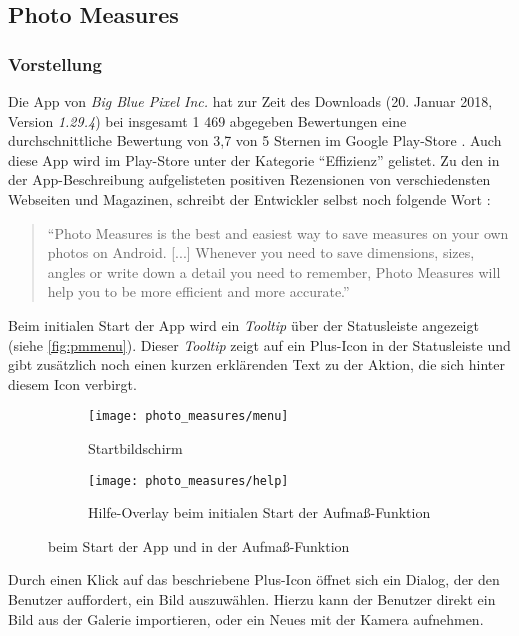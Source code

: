 \subsection{Photo Measures}

\subsubsection{Vorstellung}
Die App \pm{} von \emph{Big Blue Pixel Inc.} hat zur Zeit des Downloads (20. Januar 2018, Version \emph{1.29.4}) bei insgesamt 1 469 abgegeben Bewertungen eine durchschnittliche Bewertung von 3,7 von 5 Sternen im Google Play-Store \citep{PixelPM}.
Auch diese App wird im Play-Store unter der Kategorie ``Effizienz'' gelistet.
Zu den in der App-Beschreibung aufgelisteten positiven Rezensionen von verschiedensten Webseiten und Magazinen, schreibt der Entwickler selbst noch folgende Wort \citep{PixelPM}:

\begin{quote}
  ``Photo Measures is the best and easiest way to save measures on your own photos on Android.
  [...] Whenever you need to save dimensions, sizes, angles or write down a detail you need to remember, Photo Measures will help you to be more efficient and more accurate.''
\end{quote}

\noindent
Beim initialen Start der App wird ein \emph{Tooltip} über der Statusleiste angezeigt (siehe \autoref{fig:pmmenu}).
Dieser \emph{Tooltip} zeigt auf ein Plus-Icon in der Statusleiste und gibt zusätzlich noch einen kurzen erklärenden Text zu der Aktion, die sich hinter diesem Icon verbirgt.

\begin{figure}[h]
  \centering
  \begin{subfigure}[t]{0.4\textwidth}
    \texttt{[image: photo\_measures/menu]}
    \caption{Startbildschirm}
    \label{fig:pmmenu}	
  \end{subfigure}
  \begin{subfigure}[t]{0.4\textwidth}
    \texttt{[image: photo\_measures/help]}
    \caption{Hilfe-Overlay beim initialen Start der Aufmaß-Funktion} 
    \label{fig:pmhelp}	
  \end{subfigure}
  \caption{\pm{} beim Start der App und in der Aufmaß-Funktion}
\end{figure}

\noindent
Durch einen Klick auf das beschriebene Plus-Icon öffnet sich ein Dialog, der den Benutzer auffordert, ein Bild auszuwählen.
Hierzu kann der Benutzer direkt ein Bild aus der Galerie importieren, oder ein Neues mit der Kamera aufnehmen. \\

